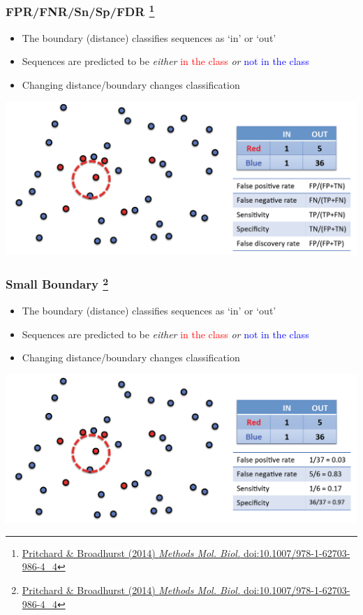 \begin{frame}
  \frametitle{FPR/FNR/Sn/Sp/FDR
  \footnote{\tiny{\href{http://dx.doi.org/10.1007/978-1-62703-986-4_4}{Pritchard \& Broadhurst (2014) \textit{Methods Mol. Biol.} doi:10.1007/978-1-62703-986-4\_4}}}
}
  \begin{itemize}
    \item \textcolor{hutton_green}{The boundary (distance) classifies sequences as `in' or `out'}
    \item Sequences are predicted to be \textit{either} \textcolor{red}{in the class} \textit{or} \textcolor{blue}{not in the class}
    \item \textcolor{hutton_purple}{Changing distance/boundary changes classification}
  \end{itemize}
  \includegraphics[width=1\textwidth]{images/finding_effectors7}    
\end{frame}

\begin{frame}
  \frametitle{Small Boundary
  \footnote{\tiny{\href{http://dx.doi.org/10.1007/978-1-62703-986-4_4}{Pritchard \& Broadhurst (2014) \textit{Methods Mol. Biol.} doi:10.1007/978-1-62703-986-4\_4}}}
}
  \begin{itemize}
    \item \textcolor{hutton_green}{The boundary (distance) classifies sequences as `in' or `out'}
    \item Sequences are predicted to be \textit{either} \textcolor{red}{in the class} \textit{or} \textcolor{blue}{not in the class}
    \item \textcolor{hutton_purple}{Changing distance/boundary changes classification}
  \end{itemize}
  \includegraphics[width=1\textwidth]{images/finding_effectors8}    
\end{frame}

